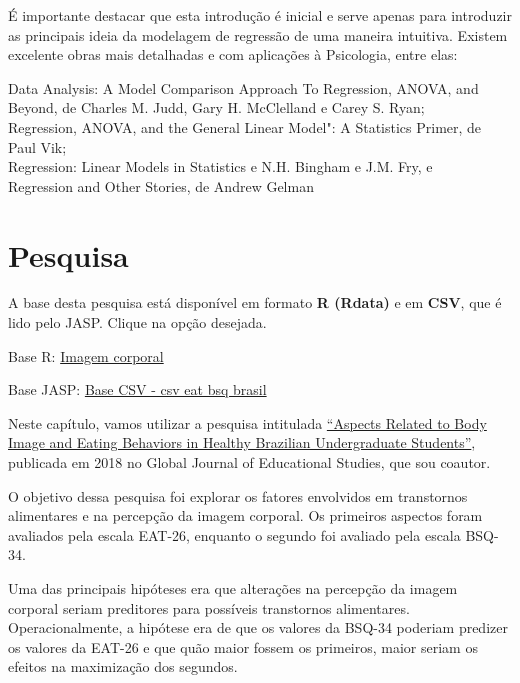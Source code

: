\documentclass[
]{book}
\begin{document}
É importante destacar que esta introdução é inicial e serve apenas para introduzir as principais ideia da modelagem de regressão de uma maneira intuitiva. Existem excelente obras mais detalhadas e com aplicações à Psicologia, entre elas:

Data Analysis: A Model Comparison Approach To Regression, ANOVA, and Beyond, de Charles M. Judd, Gary H. McClelland e Carey S. Ryan;\\
Regression, ANOVA, and the General Linear Model": A Statistics Primer, de Paul Vik;\\
Regression: Linear Models in Statistics e N.H. Bingham e J.M. Fry, e\\
Regression and Other Stories, de Andrew Gelman

\hypertarget{pesquisa-8}{%
\section{Pesquisa}\label{pesquisa-8}}

\begin{base}

A base desta pesquisa está disponível em formato \textbf{R (Rdata)} e em \textbf{CSV}, que é lido pelo JASP. Clique na opção desejada.

Base R: \href{https://github.com/anovabr/mqt/raw/master/bases/Base\%20R\%20-\%20imagem\%20corporal.RData}{Imagem corporal}

Base JASP: \href{https://github.com/anovabr/mqt/raw/master/bases/bases_csv_jasp.zip}{Base CSV - csv eat bsq brasil}

\end{base}

Neste capítulo, vamos utilizar a pesquisa intitulada \href{https://www.researchgate.net/publication/323729370_Aspects_Related_to_Body_Image_and_Eating_Behaviors_in_Healthy_Brazilian_Undergraduate_Students}{``Aspects Related to Body Image and Eating Behaviors in Healthy Brazilian Undergraduate Students''}, publicada em 2018 no Global Journal of Educational Studies, que sou coautor.

O objetivo dessa pesquisa foi explorar os fatores envolvidos em transtornos alimentares e na percepção da imagem corporal. Os primeiros aspectos foram avaliados pela escala EAT-26, enquanto o segundo foi avaliado pela escala BSQ-34.

Uma das principais hipóteses era que alterações na percepção da imagem corporal seriam preditores para possíveis transtornos alimentares. Operacionalmente, a hipótese era de que os valores da BSQ-34 poderiam predizer os valores da EAT-26 e que quão maior fossem os primeiros, maior seriam os efeitos na maximização dos segundos.
\end{document}
